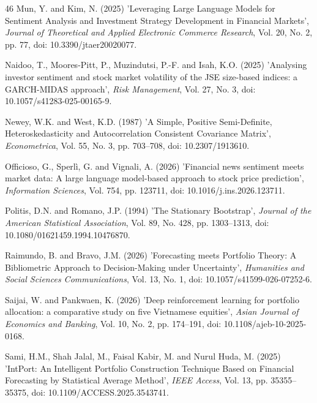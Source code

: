 \begin{thebibliography}{46}
Mun, Y. and Kim, N. (2025) 'Leveraging Large Language Models for Sentiment Analysis and Investment Strategy Development in Financial Markets', {\it Journal of Theoretical and Applied Electronic Commerce Research}, Vol. 20, No. 2, pp. 77, doi: 10.3390/jtaer20020077.

Naidoo, T., Moores-Pitt, P., Muzindutsi, P.-F. and Isah, K.O. (2025) 'Analysing investor sentiment and stock market volatility of the JSE size-based indices: a GARCH-MIDAS approach', {\it Risk Management}, Vol. 27, No. 3, doi: 10.1057/s41283-025-00165-9.

Newey, W.K. and West, K.D. (1987) 'A Simple, Positive Semi-Definite, Heteroskedasticity and Autocorrelation Consistent Covariance Matrix', {\it Econometrica}, Vol. 55, No. 3, pp. 703--708, doi: 10.2307/1913610.

Officioso, G., Sperlì, G. and Vignali, A. (2026) 'Financial news sentiment meets market data: A large language model-based approach to stock price prediction', {\it Information Sciences}, Vol. 754, pp. 123711, doi: 10.1016/j.ins.2026.123711.

Politis, D.N. and Romano, J.P. (1994) 'The Stationary Bootstrap', {\it Journal of the American Statistical Association}, Vol. 89, No. 428, pp. 1303--1313, doi: 10.1080/01621459.1994.10476870.

Raimundo, B. and Bravo, J.M. (2026) 'Forecasting meets Portfolio Theory: A Bibliometric Approach to Decision-Making under Uncertainty', {\it Humanities and Social Sciences Communications}, Vol. 13, No. 1, doi: 10.1057/s41599-026-07252-6.

Saijai, W. and Pankwaen, K. (2026) 'Deep reinforcement learning for portfolio allocation: a comparative study on five Vietnamese equities', {\it Asian Journal of Economics and Banking}, Vol. 10, No. 2, pp. 174--191, doi: 10.1108/ajeb-10-2025-0168.

Sami, H.M., Shah Jalal, M., Faisal Kabir, M. and Nurul Huda, M. (2025) 'IntPort: An Intelligent Portfolio Construction Technique Based on Financial Forecasting by Statistical Average Method', {\it IEEE Access}, Vol. 13, pp. 35355--35375, doi: 10.1109/ACCESS.2025.3543741.


\end{thebibliography}
